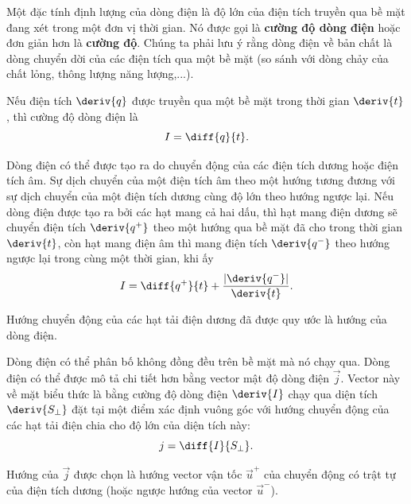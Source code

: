 Một đặc tính định lượng của dòng điện là độ lớn của điện tích truyền qua bề mặt đang xét trong một đơn vị thời gian. Nó được gọi là \textbf{cường độ dòng điện} hoặc đơn giản hơn là \textbf{cường độ}. Chúng ta phải lưu ý rằng dòng điện về bản chất là dòng chuyển dời của các điện tích qua một bề mặt (so sánh với dòng chảy của chất lỏng, thông lượng năng lượng,...).



Nếu điện tích $\deriv{q}$ được truyền qua một bề mặt trong thời gian $\deriv{t}$, thì cường độ dòng điện là
\begin{equation}\label{eq:5_1}
    I = \diff{q}{t}.
\end{equation}

\noindent
Dòng điện có thể được tạo ra do chuyển động của các điện tích dương hoặc điện tích âm. Sự dịch chuyển của một điện tích âm theo một hướng tương đương với sự dịch chuyển của một điện tích dương cùng độ lớn theo hướng ngược lại. Nếu dòng điện được tạo ra bởi các hạt mang cả hai dấu, thì hạt mang điện dương sẽ chuyển điện tích $\deriv{q^+}$ theo một hướng qua bề mặt đã cho trong thời gian $\deriv{t}$, còn hạt mang điện âm thì mang điện tích $\deriv{q^-}$ theo hướng ngược lại trong cùng một thời gian, khi ấy
\begin{equation*}
    I = \diff{q^+}{t} + \frac{|\deriv{q^-}|}{\deriv{t}}.
\end{equation*}

Hướng chuyển động của các hạt tải điện dương đã được quy ước là hướng của dòng điện.

Dòng điện có thể phân bố không đồng đều trên bề mặt mà nó chạy qua. Dòng điện có thể được mô tả chi tiết hơn bằng vector mật độ dòng điện $\vec{j}$. Vector này về mặt biểu thức là bằng cường độ dòng điện $\deriv{I}$ chạy qua diện tích $\deriv{S_{\perp}}$ đặt tại một điểm xác định vuông góc với hướng chuyển động của các hạt tải điện chia cho độ lớn của diện tích này:
\begin{equation}\label{eq:5_2}
    j = \diff{I}{S_{\perp}}.
\end{equation}

\noindent
Hướng của $\vec{j}$ được chọn là hướng vector vận tốc $\vec{u}^+$ của chuyển động có trật tự của điện tích dương (hoặc ngược hướng của vector $\vec{u}^-$).

